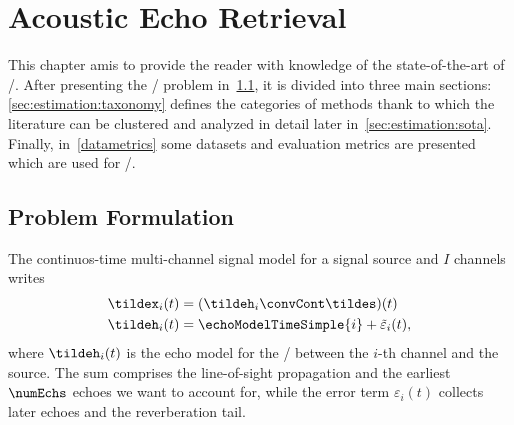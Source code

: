 \chapter{Acoustic Echo Retrieval}\label{chap:estimation}
\vspace{-2.5em}
  This chapter amis to provide the reader with knowledge of the state-of-the-art of \AERdef/.
After presenting the \AER/ problem in~\cref{sec:estimation:problem}, it is divided into three main sections:
\cref{sec:estimation:taxonomy} defines the categories of methods thank to which the literature can be clustered and analyzed in detail later in~\cref{sec:estimation:sota}.
Finally, in~\cref{datametrics} some datasets and evaluation metrics are presented which are used for \AER/.

\section{Problem Formulation}\label{sec:estimation:problem}
The continuos-time multi-channel signal model for a signal source and $I$ channels writes
\begin{equation}\label{eq:estimation:signalmodel}
    \begin{aligned}
        \tildex_i(t) &= (\tildeh_i \convCont \tildes)(t) \\
        \tildeh_i(t) &= \echoModelTimeSimple{i} + \tilde{\varepsilon}_i(t),
    \end{aligned}
\end{equation}
where $\tildeh_i(t)$ is the echo model for the \RIR/ between the $i$-th channel and the source.
The sum comprises the line-of-sight propagation and the earliest $\numEchs$ echoes we want to account for, while the error term $\varepsilon_i(t)$ collects later echoes and the reverberation tail.

